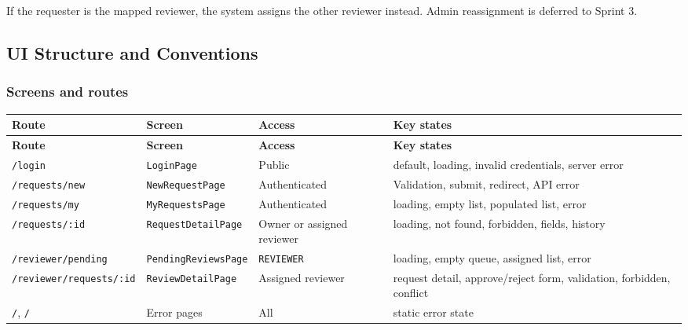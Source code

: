 \documentclass[11pt,a4paper]{article}
\begin{document}
If the requester is the mapped reviewer, the system assigns the other reviewer instead. Admin reassignment is deferred to Sprint 3.\\


\subsection{UI Structure and Conventions}

\subsubsection{Screens and routes}

\vspace{0.3em}
\begin{longtable}{|>{\RaggedRight}p{4.2cm}|>{\RaggedRight}p{3.2cm}|>{\centering\arraybackslash}p{2.0cm}|>{\RaggedRight}p{5.3cm}|}
\hline
\rowcolor{zenPale}\textbf{Route} & \textbf{Screen} & \textbf{Access} & \textbf{Key states} \\ \hline
\endfirsthead
\hline
\rowcolor{zenPale}\textbf{Route} & \textbf{Screen} & \textbf{Access} & \textbf{Key states} \\ \hline
\endhead
\hline
\endfoot
\texttt{/\allowbreak login} & \texttt{LoginPage} & Public & default, loading, invalid credentials, server error \\ \hline
\texttt{/\allowbreak requests/\allowbreak new} & \texttt{NewRequestPage} & Authenticated & Validation, submit, redirect, API error \\ \hline
\texttt{/\allowbreak requests/\allowbreak my} & \texttt{MyRequestsPage} & Authenticated & loading, empty list, populated list, error \\ \hline
\texttt{/\allowbreak requests/\allowbreak :\allowbreak id} & \texttt{RequestDetailPage} & Owner or assigned reviewer & loading, not found, forbidden, fields, history \\ \hline
\texttt{/\allowbreak reviewer/\allowbreak pending} & \texttt{PendingReviewsPage} & \texttt{REVIEWER} & loading, empty queue, assigned list, error \\ \hline
\texttt{/\allowbreak reviewer/\allowbreak requests/\allowbreak :\allowbreak id} & \texttt{ReviewDetailPage} & Assigned reviewer & request detail, approve/reject form, validation, forbidden, conflict \\ \hline
\texttt{/\allowbreak 403}, \texttt{/\allowbreak 404} & Error pages & All & static error state \\ \hline
\end{longtable}
\vspace{0.3em}
\end{document}
